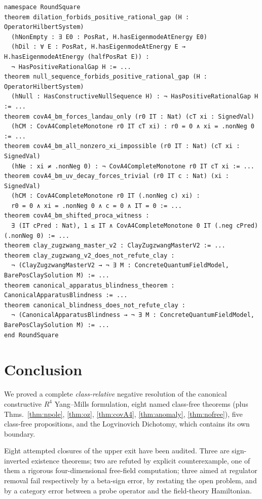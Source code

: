 \documentclass[11pt,a4paper]{article}
\def\R{R}\def\N{N}\def\Q{Q}\def\Z{Z}\def\Class{C}\def\OS{OS}\def\Gap{Gap}%
\theoremstyle{plain}
\theoremstyle{definition}
\theoremstyle{remark}
\newcommand{\R}{\mathbb{R}}\newcommand{\N}{\mathbb{N}}\newcommand{\Q}{\mathbb{Q}}
\newcommand{\Z}{\mathbb{Z}}\newcommand{\Spec}{\operatorname{Spec}}
\newcommand{\OS}{\mathrm{OS}}\newcommand{\Gap}{\mathrm{Gap}}
\newcommand{\Class}{\mathcal{C}}\newcommand{\Htot}{\mathcal{H}}
\renewcommand{\_}{\oldunderscore\allowbreak}
\begin{document}
\begin{lstlisting}
namespace RoundSquare
theorem dilation_forbids_positive_rational_gap (H : OperatorHilbertSystem)
  (hNonEmpty : ∃ E0 : PosRat, H.hasEigenmodeAtEnergy E0)
  (hDil : ∀ E : PosRat, H.hasEigenmodeAtEnergy E → H.hasEigenmodeAtEnergy (halfPosRat E)) :
  ¬ HasPositiveRationalGap H := ...
theorem null_sequence_forbids_positive_rational_gap (H : OperatorHilbertSystem)
  (hNull : HasConstructiveNullSequence H) : ¬ HasPositiveRationalGap H := ...
theorem covA4_bm_forces_landau_only (r0 IT : Nat) (cT xi : SignedVal)
  (hCM : CovA4CompleteMonotone r0 IT cT xi) : r0 = 0 ∧ xi = .nonNeg 0 := ...
theorem covA4_bm_all_nonzero_xi_impossible (r0 IT : Nat) (cT xi : SignedVal)
  (hNe : xi ≠ .nonNeg 0) : ¬ CovA4CompleteMonotone r0 IT cT xi := ...
theorem covA4_bm_uv_decay_forces_trivial (r0 IT c : Nat) (xi : SignedVal)
  (hCM : CovA4CompleteMonotone r0 IT (.nonNeg c) xi) :
  r0 = 0 ∧ xi = .nonNeg 0 ∧ c = 0 ∧ IT = 0 := ...
theorem covA4_bm_shifted_proca_witness :
  ∃ (IT cPred : Nat), 1 ≤ IT ∧ CovA4CompleteMonotone 0 IT (.neg cPred) (.nonNeg 0) := ...
theorem clay_zugzwang_master_v2 : ClayZugzwangMasterV2 := ...
theorem clay_zugzwang_v2_does_not_refute_clay :
  ¬ (ClayZugzwangMasterV2 → ¬ ∃ M : ConcreteQuantumFieldModel, BarePosClaySolution M) := ...
theorem canonical_apparatus_blindness_theorem : CanonicalApparatusBlindness := ...
theorem canonical_blindness_does_not_refute_clay :
  ¬ (CanonicalApparatusBlindness → ¬ ∃ M : ConcreteQuantumFieldModel, BarePosClaySolution M) := ...
end RoundSquare
\end{lstlisting}



\section{Conclusion}
We proved a complete \emph{class-relative} negative resolution of the canonical constructive
$\R^4$ Yang--Mills formulation, eight named class-free theorems (plus Thms.~\ref{thm:npole}, \ref{thm:oz}, \ref{thm:covA4}, \ref{thm:anomaly}, \ref{thm:nofree}), five class-free propositions, and
the Logvinovich Dichotomy, which contains its own boundary.

Eight attempted closures of the upper exit have been audited. Three are sign-inverted existence
theorems; two are refuted by explicit counterexample, one of them a rigorous four-dimensional
free-field computation; three aimed at regulator removal fail respectively by a beta-sign error,
by restating the open problem, and by a category error between a probe operator and the
field-theory Hamiltonian.
\end{document}
